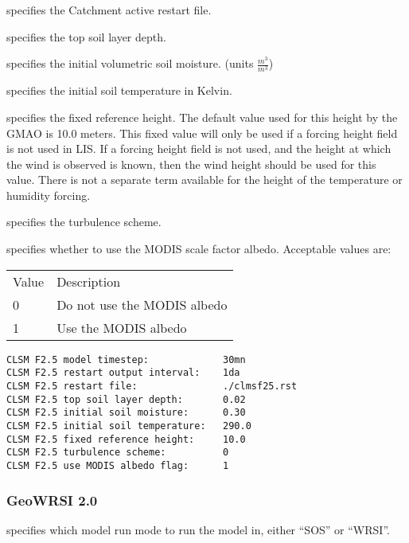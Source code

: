   specifies the Catchment active
 restart file.

  specifies the top soil
 layer depth.

  specifies the
 initial volumetric soil moisture. (units $\frac{m^3}{m^3}$)

  specifies the
 initial soil temperature in Kelvin.

  specifies the fixed
 reference height.  The default value used for this height by
 the GMAO is 10.0 meters.  This fixed value will only be used
 if a forcing height field is not used in LIS.  If a forcing
 height field is not used, and the height at which the wind
 is observed is known, then the wind height should be used
 for this value.  There is not a separate term available
 for the height of the temperature or humidity forcing.

  specifies the
 turbulence scheme.

  specifies
 whether to use the MODIS scale factor albedo.
 Acceptable values are:

 \begin{tabular}{ll}
 Value & Description                 \\
 0     & Do not use the MODIS albedo \\
 1     & Use the MODIS albedo        \\
 \end{tabular}

 \begin{Verbatim}[frame=single]
CLSM F2.5 model timestep:             30mn
CLSM F2.5 restart output interval:    1da
CLSM F2.5 restart file:               ./clmsf25.rst
CLSM F2.5 top soil layer depth:       0.02
CLSM F2.5 initial soil moisture:      0.30
CLSM F2.5 initial soil temperature:   290.0
CLSM F2.5 fixed reference height:     10.0
CLSM F2.5 turbulence scheme:          0
CLSM F2.5 use MODIS albedo flag:      1
 \end{Verbatim}

 
 \subsubsection{GeoWRSI 2.0} \label{sssec:geowrsi.2}
 

 
  specifies which model run
 mode to run the model in, either ``SOS'' or ``WRSI''.


